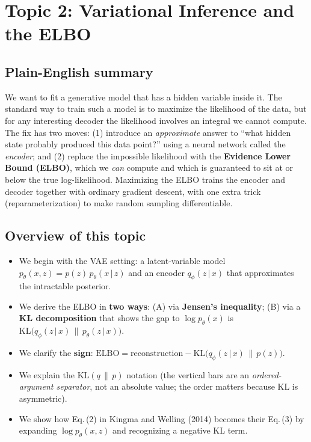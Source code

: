 \documentclass[11pt]{article}
\newcommand{\KL}{\mathrm{KL}}
\newcommand{\given}{\,\vert\,}
\theoremstyle{remark}
\begin{document}
\section{Topic 2: Variational Inference and the ELBO}

\subsection{Plain-English summary}
We want to fit a generative model that has a hidden variable inside it. The standard way to train such a model is to maximize the likelihood of the data, but for any interesting decoder the likelihood involves an integral we cannot compute. The fix has two moves: (1) introduce an \emph{approximate} answer to ``what hidden state probably produced this data point?'' using a neural network called the \emph{encoder}; and (2) replace the impossible likelihood with the \textbf{Evidence Lower Bound (ELBO)}, which we \emph{can} compute and which is guaranteed to sit at or below the true log-likelihood. Maximizing the ELBO trains the encoder and decoder together with ordinary gradient descent, with one extra trick (reparameterization) to make random sampling differentiable.

\subsection{Overview of this topic}
\begin{itemize}[leftmargin=1.2em]
  \item We begin with the VAE setting: a latent-variable model $p_\theta(x,z)=p(z)\,p_\theta(x\given z)$ and an encoder $q_\phi(z\given x)$ that approximates the intractable posterior.
  \item We derive the ELBO in \textbf{two ways}: (A) via \textbf{Jensen's inequality}; (B) via a \textbf{KL decomposition} that shows the gap to $\log p_\theta(x)$ is $\KL\!\big(q_\phi(z\given x)\,\|\,p_\theta(z\given x)\big)$.
  \item We clarify the \textbf{sign}: $\text{ELBO} = \text{reconstruction} - \KL\!\big(q_\phi(z\given x)\,\|\,p(z)\big)$.
  \item We explain the $\KL(q\,\|\,p)$ notation (the vertical bars are an \emph{ordered-argument separator}, not an absolute value; the order matters because KL is asymmetric).
  \item We show how Eq.\,(2) in Kingma and Welling (2014) becomes their Eq.\,(3) by expanding $\log p_\theta(x,z)$ and recognizing a negative KL term.
\end{itemize}
\end{document}
